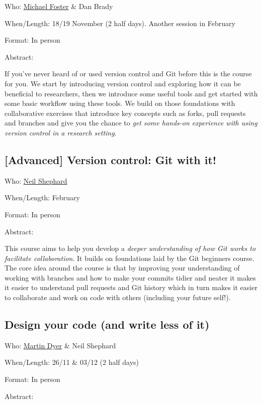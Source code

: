 \documentclass[
  letterpaper,
  DIV=11,
  numbers=noendperiod]{scrartcl}
\begin{document}
{Who}: \href{mailto:m.foster@sheffield.ac.uk}{Michael Foster} \& Dan
Brady

{When/Length}: 18/19 November (2 half days). Another session in February

{Format}: In person

Abstract:

If you've never heard of or used version control and Git before this is
the course for you. We start by introducing version control and
exploring how it can be beneficial to researchers, then we introduce
some useful tools and get started with some basic workflow using these
tools. We build on those foundations with collaborative exercises that
introduce key concepts such as forks, pull requests and branches and
give you the chance to {\emph{get some hands-on experience with using
version control in a research setting}}.

\subsection{{[}Advanced{]} Version control: Git with
it!}\label{advanced-version-control-git-with-it}

{Who}: \href{mailto:neil.shephard@sheffield.ac.uk}{Neil Shephard}

{When/Length}: February

{Format}: In person

Abstract:

This course aims to help you develop a {\emph{deeper understanding of
how Git works to facilitate collaboration}}. It builds on foundations
laid by the Git beginners course. The core idea around the course is
that by improving your understanding of working with branches and how to
make your commits tidier and neater it makes it easier to understand
pull requests and Git history which in turn makes it easier to
collaborate and work on code with others (including your future self!).

\subsection{Design your code (and write less of
it)}\label{design-your-code-and-write-less-of-it}

{Who}: \href{mailto:martin.dyer@sheffield.ac.uk}{Martin Dyer} \& Neil
Shephard

{When/Length}: 26/11 \& 03/12 (2 half days)

{Format}: In person

Abstract:
\end{document}
